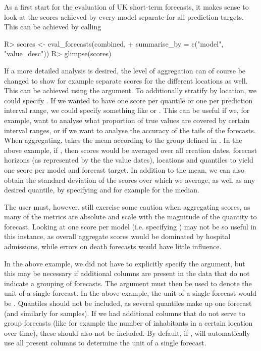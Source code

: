 \documentclass[article]{jss}
\newcommand{\fct}[1]{\code{#1()}}
\begin{document}
As a first start for the evaluation of UK short-term forecasts, it makes sense to look at the scores achieved by every model separate for all prediction targets. This can be achieved by calling
% 
\begin{Schunk}
\begin{Sinput}
R> scores <- eval_forecasts(combined, 
+                           summarise_by = c("model", "value_desc"))
R> glimpse(scores)
\end{Sinput}
\end{Schunk}
% 
If a more detailed analysis is desired, the level of aggregation can of course be changed to show for example separate scores for the different locations as well. This can be achieved using the  argument. To additionally stratify by location, we could specify . If we wanted to have one score per quantile or one per prediction interval range, we could specify something like  or . This can be useful if we, for example, want to analyse what proportion of true values are covered by certain interval ranges, or if we want to analyse the accuracy of the tails of the forecasts. When aggregating, \fct{eval\_forecasts} takes the mean according to the group defined in . In the above example, if , then scores would be averaged over all creation dates, forecast horizons (as represented by the the value dates), locations and quantiles to yield one score per model and forecast target. In addition to the mean, we can also obtain the standard deviation of the scores over which we average, as well as any desired quantile, by specifying  and for example  for the median. 

The user must, however, still exercise some caution when aggregating scores, as many of the metrics are absolute and scale with the magnitude of the quantity to forecast. Looking at one score per model (i.e. specifying ) may not be so useful in this instance, as overall aggregate scores would be dominated by hospital admissions, while errors on death forecasts would have little influence. 

In the above example, we did not have to explicitly specify the  argument, but this may be necessary if additional columns are present in the data that do not indicate a grouping of forecasts. The  argument must then be used to denote the unit of a single forecast. In the above example, the unit of a single forecast would be . Quantiles should not be included, as several quantiles make up one forecast (and similarly for samples). If we had additional columns that do not serve to group forecasts (like for example the number of inhabitants in a certain location over time), these should also not be included. By default, if , \fct{eval\_forecasts} will automatically use all present columns to determine the unit of a single forecast.
\end{document}
